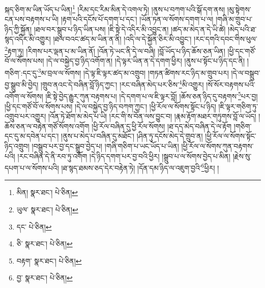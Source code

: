 སྐད་ཅིག་མ་ཡིན་ཡོད་པ་ཡིན།\footnote{མིན།  སྣར་ཐང་།  པེ་ཅིན། } །རིམ་དང་རིམ་མིན་དེ་འགལ་ཏེ། །ནུས་པ་བཀག་པའི་སྒོ་དག་ནས། །མུ་སྟེགས་ངན་པས་བརྟགས་པ་ཡི། །རྟག་པའི་དངོས་པོ་དགག་པ་དང་། །ཡོན་ཏན་ལ་སོགས་དགག་པ་ལ། །གཞི་མ་གྲུབ་པ་ཉིད་ཀྱི་སྐྱོན། །ཐལ་བར་སྒྲུབ་པ་ཉིད་ཡིན་པས། །ཇི་སྟེ་དེ་འདིར་མི་འབྱུང་ན། །ཚད་མ་མེད་ན་དེ་ཡི་ཚེ། །མེད་པའི་ཐ་སྙད་འདིར་མི་འགྱུར། །ཐལ་བའང་ཚད་མ་ཡིན་ན་ནི། །འདི་ལ་དེ་སྐྱོན་ཅིར་མི་འབྱུང་། །རང་དགའི་དབང་གིས་ཕུལ་\footnote{ཡུལ་  སྣར་ཐང་།  པེ་ཅིན། }རྟག་ཏུ། །རིགས་པར་ལྡན་པ་མ་ཡིན་ནོ། །འོན་ཏེ་ཡང་ནི་དེ་ལ་བཞི། །བློ་ཡོད་པ་ཉིད་ཆོས་ཅན་ཡིན། །ཕྱི་དང་གཙོ་བོ་ལ་སོགས་པས། །དེ་ལ་བསྐྱེད་བྱ་ཉིད་འགོག་ན། །དེ་ལྟར་ཡིན་ན་དེ་དགག་ཕྱིར། །ནུས་པ་སྟོང་པ་ཉིད་དང་ནི། །གཅིག་:དང་དུ་\footnote{དང་  པེ་ཅིན། }མ་བྲལ་ལ་སོགས། །དེ་ལྟ་ཇི་ལྟར་ཚད་མ་འགྲུབ། །གཏན་ཚིགས་རང་ཉིད་མ་གྲུབ་པར། །དེ་ལ་བསྒྲུབ་བྱ་སྒྲུབ་མི་བྱེད། །གྲུབ་ནའང་དེ་བཞིན་བློ་ཉིད་ཀྱང་། །རང་བཞིན་མེད་པར་ཅིས་\footnote{ཅི་  སྣར་ཐང་།  པེ་ཅིན། }མི་འགྱུར། །སོ་སོར་བརྟགས་པའི་འགོག་ལ་སོགས། །ཇི་སྟེ་བྱེད་རྒྱུར་ཀུན་བརྟགས་པ། །དེ་དགག་པ་ལ་ཇི་ལྟར་བློ། །ཆོས་ཅན་ཉིད་དུ་བརྟགས་\footnote{བརྟག་  སྣར་ཐང་།  པེ་ཅིན། }པར་བྱ། །ཕྱི་དང་གཙོ་བོ་ལ་སོགས་པས། །དེ་ལ་བསྐྱེད་བྱ་ཉིད་བཀག་ཀྱང་། །ཕྱི་རོལ་ལ་སོགས་སྟོང་པ་ཉིད། །ཇི་ལྟར་གཅིག་ཏུ་འགྲུབ་པར་འགྱུར། །འོན་ཏེ་ཐོག་མ་མེད་པ་ཡི། །རང་གི་ས་བོན་ལས་བྱུང་བ། །རྣམ་རྟོག་མཐར་གཏུགས་བློ་ལ་ཡོད། །ཆོས་ཅན་ལ་བརྟེན་གཙོ་སོགས་འགོག །ཕྱི་རོལ་བཞིན་དུ་ཕྱི་རོལ་སོགས། །ཐ་དད་མེད་བཞིན་དེ་ལ་རྟོག །གཅིག་དང་དུ་མ་དབེན་པ་དང་། །ནུས་པ་མེད་པ་བཞིན་དུ་མཐོང་། །ཤིན་ཏུ་དངོས་མེད་དེ་གྲུབ་ན། །ཕྱི་རོལ་ལ་སོགས་སྟོང་ཉིད་འགྲུབ། །བསྒྲུབ་པར་བྱ་དང་སྒྲུབ་བྱེད་པ། །གཞི་གཅིག་པ་ཡང་ཡོད་པ་ཡིན། །ཕྱི་རོལ་ལ་སོགས་ཀུན་བརྟགས་པའི། །རང་བཞིན་དེ་ནི་རབ་ཏུ་འགོག །དེ་ཉིད་དགག་པར་བྱ་བའི་ཕྱིར། །སྒྲུབ་པ་ལ་སོགས་བྱེད་པ་མིན། །རྗེས་སུ་དཔག་པ་ལ་སོགས་པའི། །ཐ་སྙད་ཐམས་ཅད་དེར་བརྟེན་ཏེ། །དོན་དམ་ཉིད་ལ་འཇུག་བྱའི་\footnote{བྱ་  སྣར་ཐང་།  པེ་ཅིན། }ཕྱིར། །

